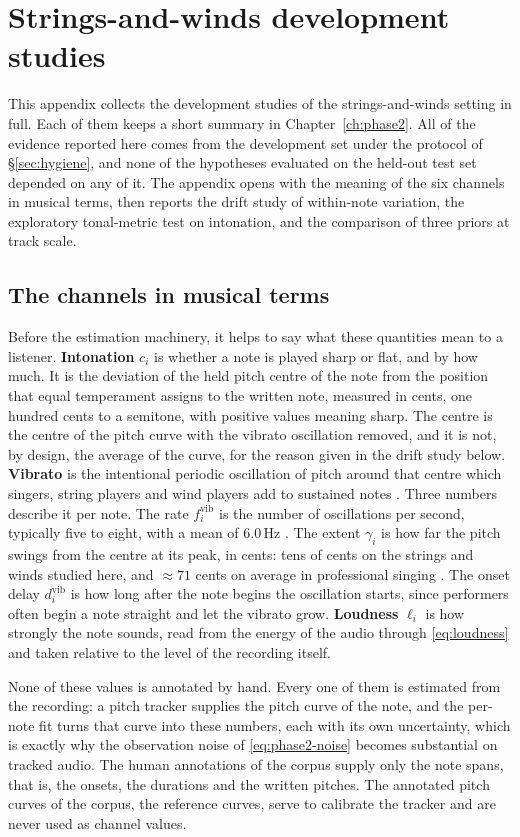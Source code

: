 \chapter{Strings-and-winds development studies}\label{app:phase2dev}
This appendix collects the development studies of the strings-and-winds
setting in full. Each of them keeps a short summary in
Chapter~\ref{ch:phase2}. All of the evidence reported here comes from the
development set under the protocol of \S\ref{sec:hygiene}, and none of the
hypotheses evaluated on the held-out test set depended on any of it. The
appendix opens with the meaning of the six channels in musical terms, then
reports the drift study of within-note variation, the exploratory
tonal-metric test on intonation, and the comparison of three priors at
track scale.

\section{The channels in musical terms}\label{app:glossary}
Before the estimation machinery, it helps to say what these quantities mean
to a listener. \textbf{Intonation} $c_i$ is whether a note is played sharp
or flat, and by how much. It is the deviation of the held pitch centre of
the note from the position that equal temperament assigns to the written
note, measured in cents, one hundred cents to a semitone, with positive
values meaning sharp. The centre is the centre of the pitch curve with the
vibrato oscillation removed, and it is not, by design, the average of the
curve, for the reason given in the drift study below. \textbf{Vibrato} is
the intentional periodic oscillation of pitch around that centre which
singers, string players and wind players add to sustained notes
\cite{seashore1936}. Three numbers describe it per note. The rate
$f_i^{\mathrm{vib}}$ is the number of oscillations per second, typically
five to eight, with a mean of $6.0$\,Hz \cite{prame1994}. The extent
$\gamma_i$ is how far the pitch swings from the centre at its peak, in
cents: tens of cents on the strings and winds studied here, and
$\approx 71$ cents on average in professional singing \cite{prame1997}. The
onset delay $d_i^{\mathrm{vib}}$ is how long after the note begins the
oscillation starts, since performers often begin a note straight and let
the vibrato grow. \textbf{Loudness} $\ell_i$ is how strongly the note
sounds, read from the energy of the audio through \eqref{eq:loudness} and
taken relative to the level of the recording itself.

None of these values is annotated by hand. Every one of them is estimated
from the recording: a pitch tracker supplies the pitch curve of the note,
and the per-note fit turns that curve into these numbers, each with its own
uncertainty, which is exactly why the observation noise of
\eqref{eq:phase2-noise} becomes substantial on tracked audio. The human
annotations of the corpus supply only the note spans, that is, the onsets,
the durations and the written pitches. The annotated pitch curves of the
corpus, the reference curves, serve to calibrate the tracker and are never
used as channel values.

